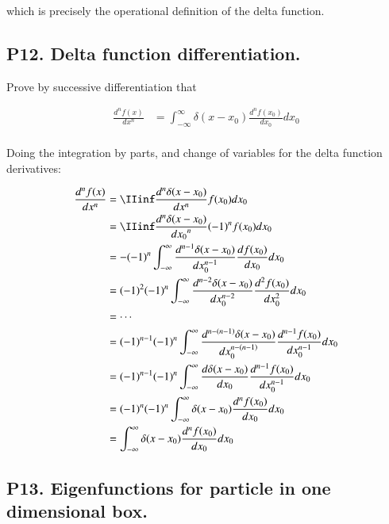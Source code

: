 which is precisely the operational definition of the delta function.

\subsection{P12. Delta function differentiation. }

Prove by successive differentiation that

\begin{align*}
\frac{d^n f(x)}{dx^n} 
&= \int_{-\infty}^{\infty} \delta(x - x_0) \frac{d^n f(x_0)}{dx_0} dx_0 \\
\end{align*}

Doing the integration by parts, and change of variables for the delta function derivatives:

\begin{align*}
\frac{d^n f(x)}{dx^n} 
&= \IIinf \frac{d^n \delta(x - x_0)}{dx^n} f(x_0) dx_0 \\
&= \IIinf \frac{d^n \delta(x-x_0)}{{dx_0}^n} (-1)^n f(x_0) dx_0 \\
&= -(-1)^n \int_{-\infty}^{\infty} \frac{d^{n-1} \delta(x - x_0)}{dx_0^{n-1}} \frac{df(x_0)}{dx_0} dx_0 \\
&= (-1)^2 (-1)^n \int_{-\infty}^{\infty} \frac{d^{n-2} \delta(x - x_0)}{dx_0^{n-2}} \frac{d^2 f(x_0)}{dx_0^2} dx_0 \\
&= \cdots \\
&= (-1)^{n-1} (-1)^n \int_{-\infty}^{\infty} \frac{d^{n-(n-1)} \delta(x - x_0)}{dx_0^{n-(n-1)}} \frac{d^{n-1} f(x_0)}{dx_0^{n-1}} dx_0 \\
&= (-1)^{n-1} (-1)^n \int_{-\infty}^{\infty} \frac{d \delta(x - x_0)}{dx_0} \frac{d^{n-1} f(x_0)}{dx_0^{n-1}} dx_0 \\
&= (-1)^n (-1)^n \int_{-\infty}^{\infty} \delta(x - x_0) \frac{d^n f(x_0)}{dx_0} dx_0 \\
&= \int_{-\infty}^{\infty} \delta(x - x_0) \frac{d^n f(x_0)}{dx_0} dx_0 \\
\end{align*}

\subsection{P13. Eigenfunctions for particle in one dimensional box. }

